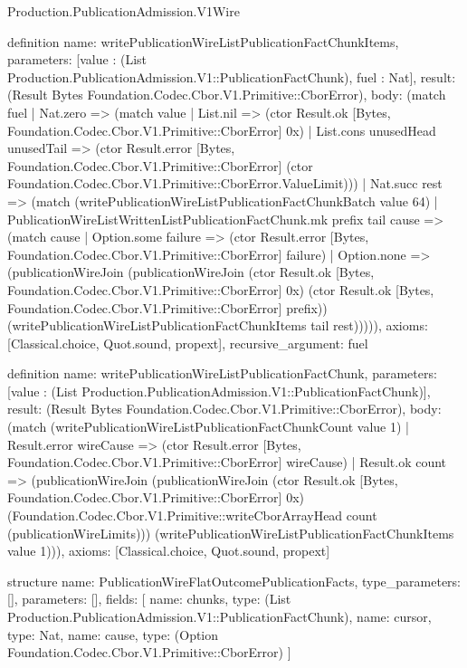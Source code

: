\begin{lexlean}{Production.PublicationAdmission.V1Wire}
\begin{semanticmodule}
definition{
  name: writePublicationWireListPublicationFactChunkItems,
  parameters: [value : (List Production.PublicationAdmission.V1::PublicationFactChunk), fuel : Nat],
  result: (Result Bytes Foundation.Codec.Cbor.V1.Primitive::CborError),
  body: (match fuel
    | Nat.zero => (match value
      | List.nil => (ctor Result.ok [Bytes, Foundation.Codec.Cbor.V1.Primitive::CborError] 0x)
      | List.cons unusedHead unusedTail => (ctor Result.error [Bytes, Foundation.Codec.Cbor.V1.Primitive::CborError] (ctor Foundation.Codec.Cbor.V1.Primitive::CborError.ValueLimit)))
    | Nat.succ rest => (match (writePublicationWireListPublicationFactChunkBatch value 64)
      | PublicationWireListWrittenListPublicationFactChunk.mk prefix tail cause => (match cause
        | Option.some failure => (ctor Result.error [Bytes, Foundation.Codec.Cbor.V1.Primitive::CborError] failure)
        | Option.none => (publicationWireJoin (publicationWireJoin (ctor Result.ok [Bytes, Foundation.Codec.Cbor.V1.Primitive::CborError] 0x) (ctor Result.ok [Bytes, Foundation.Codec.Cbor.V1.Primitive::CborError] prefix)) (writePublicationWireListPublicationFactChunkItems tail rest))))),
  axioms: [Classical.choice, Quot.sound, propext],
  recursive_argument: fuel
}

definition{
  name: writePublicationWireListPublicationFactChunk,
  parameters: [value : (List Production.PublicationAdmission.V1::PublicationFactChunk)],
  result: (Result Bytes Foundation.Codec.Cbor.V1.Primitive::CborError),
  body: (match (writePublicationWireListPublicationFactChunkCount value 1)
    | Result.error wireCause => (ctor Result.error [Bytes, Foundation.Codec.Cbor.V1.Primitive::CborError] wireCause)
    | Result.ok count => (publicationWireJoin (publicationWireJoin (ctor Result.ok [Bytes, Foundation.Codec.Cbor.V1.Primitive::CborError] 0x) (Foundation.Codec.Cbor.V1.Primitive::writeCborArrayHead count (publicationWireLimits))) (writePublicationWireListPublicationFactChunkItems value 1))),
  axioms: [Classical.choice, Quot.sound, propext]
}

structure{
  name: PublicationWireFlatOutcomePublicationFacts,
  type_parameters: [],
  parameters: [],
  fields: [
    {name: chunks, type: (List Production.PublicationAdmission.V1::PublicationFactChunk)},
    {name: cursor, type: Nat},
    {name: cause, type: (Option Foundation.Codec.Cbor.V1.Primitive::CborError)}
  ]
}


\end{semanticmodule}
\end{lexlean}
